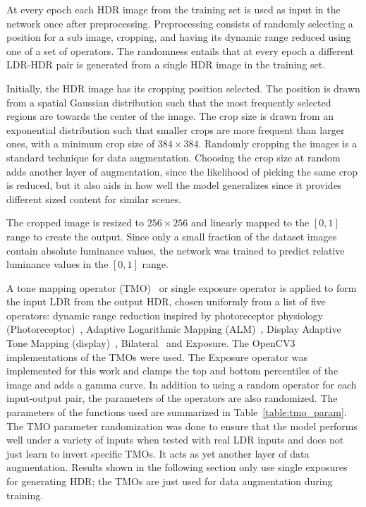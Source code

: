 \documentclass{egpubl}
\begin{document}
At every epoch each HDR image from the training set is used as input in the
network once after preprocessing. Preprocessing consists of randomly selecting
a position for a sub image, cropping, and having its dynamic range reduced
using one of a set of operators. The randomness entails that at every epoch a
different LDR-HDR pair is generated from a single HDR image in the training
set.

Initially, the HDR image has its cropping position selected. The position is drawn from a spatial Gaussian distribution such that the most frequently
selected regions are towards the center of the image. The crop size is drawn from an exponential distribution such that smaller crops are more
frequent than larger ones, with a minimum crop size of $384\times384$. Randomly cropping the images is a standard technique for data augmentation.
Choosing the crop size at random adds another layer of augmentation, since the likelihood of picking the same crop is reduced, but it also aids in
how well the model generalizes since it provides different sized content for similar scenes.

The cropped image is resized to $256\times256$ and linearly mapped to the
$[0,1]$ range to create the output. Since only a small fraction of the dataset
images contain absolute luminance values, the network was trained to predict
relative luminance values in the $[0,1]$ range.

A tone mapping operator (TMO)~\cite{tumblin1993tonemap} or single exposure operator is applied to form the input LDR from the output HDR, chosen
uniformly from a list of five operators: dynamic range reduction inspired by photoreceptor physiology (Photoreceptor)~\cite{reinhard2005dynamic},
Adaptive Logarithmic Mapping (ALM)~\cite{drago2003tmo}, Display Adaptive Tone Mapping (display)~\cite{mantiuk08display},
Bilateral~\cite{durand2002tmo} and Exposure. The OpenCV3 implementations of the TMOs were used. The Exposure operator was implemented for this work
and clamps the top and bottom percentiles of the image and adds a gamma curve. In addition to using a random operator for each input-output pair, the
parameters of the operators are also randomized. The parameters of the functions used are summarized in Table~\ref{table:tmo_param}. The TMO
parameter randomization was done to ensure that the model performs well under a variety of inputs when tested with real LDR inputs and does not just
learn to invert specific TMOs. It acts as yet another layer of data augmentation. Results shown in the following section only use single exposures
for generating HDR; the TMOs are just used for data augmentation during training.
\end{document}
